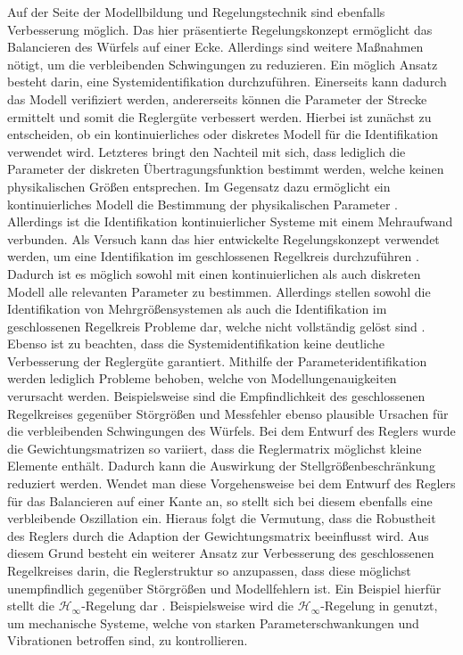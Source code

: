 Auf der Seite der Modellbildung und Regelungstechnik sind ebenfalls Verbesserung möglich. Das hier präsentierte Regelungskonzept ermöglicht das Balancieren des Würfels auf einer Ecke. Allerdings sind weitere Maßnahmen nötigt, um die verbleibenden Schwingungen zu reduzieren. Ein möglich Ansatz besteht darin, eine Systemidentifikation durchzuführen. Einerseits kann dadurch das Modell verifiziert werden, andererseits können die Parameter der Strecke ermittelt und somit die Reglergüte verbessert werden. Hierbei ist zunächst zu entscheiden, ob ein kontinuierliches oder diskretes Modell für die Identifikation verwendet wird. Letzteres bringt den Nachteil mit sich, dass lediglich die Parameter der diskreten Übertragungsfunktion bestimmt werden, welche keinen physikalischen Größen entsprechen. Im Gegensatz dazu ermöglicht ein kontinuierliches Modell die Bestimmung der physikalischen Parameter \cite[S. 189 ff.]{UnbehauenSysId}. Allerdings ist die Identifikation kontinuierlicher Systeme mit einem Mehraufwand verbunden.
Als Versuch kann das hier entwickelte Regelungskonzept verwendet werden, um eine Identifikation im geschlossenen Regelkreis durchzuführen \cite[S. 126 ff.]{UnbehauenSysId}. Dadurch ist es möglich sowohl mit einen kontinuierlichen als auch diskreten Modell alle relevanten Parameter zu bestimmen. Allerdings stellen sowohl die Identifikation von Mehrgrößensystemen als auch die Identifikation im geschlossenen Regelkreis Probleme dar, welche nicht vollständig gelöst sind \cite[S. 187 f.]{UnbehauenSysId}. Ebenso ist zu beachten, dass die Systemidentifikation keine deutliche Verbesserung der Reglergüte garantiert. Mithilfe der Parameteridentifikation werden lediglich Probleme behoben, welche von Modellungenauigkeiten verursacht werden. Beispielsweise sind die Empfindlichkeit des geschlossenen Regelkreises gegenüber Störgrößen und Messfehler ebenso plausible Ursachen für die verbleibenden Schwingungen des Würfels. 
Bei dem Entwurf des Reglers wurde die Gewichtungsmatrizen so variiert, dass die Reglermatrix möglichst kleine Elemente enthält. Dadurch kann die Auswirkung der Stellgrößenbeschränkung reduziert werden. Wendet man diese Vorgehensweise bei dem Entwurf des Reglers für das Balancieren auf einer Kante an, so stellt sich bei diesem ebenfalls eine verbleibende Oszillation ein. Hieraus folgt die Vermutung, dass die Robustheit des Reglers durch die Adaption der Gewichtungsmatrix beeinflusst wird.
Aus diesem Grund besteht ein weiterer Ansatz zur Verbesserung des geschlossenen Regelkreises darin, die Reglerstruktur so anzupassen, dass diese möglichst unempfindlich gegenüber Störgrößen und Modellfehlern ist. Ein Beispiel hierfür stellt die $\mathcal{H}_\infty$-Regelung dar \cite[S. 224 ff.]{Ludyk}. Beispielsweise wird die $\mathcal{H}_\infty$-Regelung in \cite{Toda} genutzt, um mechanische Systeme, welche von starken Parameterschwankungen und Vibrationen betroffen sind, zu kontrollieren. 

